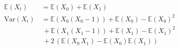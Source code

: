 \documentclass[10pt]{article}
\begin{document}
\begin{align*}\mathbb{E}(X_t) \quad &= \mathbb{E}(X_0) + \mathbb{E}(X_1)\\[.2cm]
\mathrm{Var}(X_t)\,&= \mathbb{E}(X_0(X_0-1))+\mathbb{E}(X_0)-\mathbb{E}(X_0)^2 \\
 &\,+ \mathbb{E}(X_1(X_1-1))+\mathbb{E}(X_1)-\mathbb{E}(X_1)^2 \\
 &\,+ 2\,(\mathbb{E}(X_0\,X_1)-\mathbb{E}(X_0)\mathbb{E}(X_1))\\\end{align*}
\end{document}

